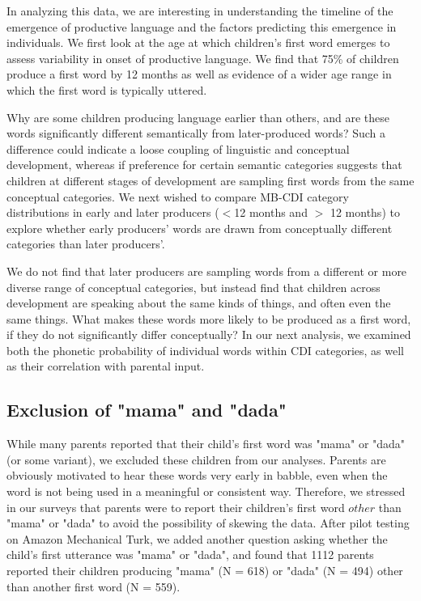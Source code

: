 \documentclass[10pt,letterpaper]{article}
\begin{document}
In analyzing this data, we are interesting in understanding the timeline of the emergence of productive language and the factors predicting this emergence in individuals. We first look at the age at which children's first word emerges to assess variability in onset of productive language. We find that 75\% of children produce a first word by 12 months as well as evidence of a wider age range in which the first word is typically uttered.

Why are some children producing language earlier than others, and are these words significantly different semantically from later-produced words? Such a difference could indicate a loose coupling of linguistic and conceptual development, whereas if preference for certain semantic categories suggests that children at different stages of development are sampling first words from the same conceptual categories. We next wished to compare MB-CDI category distributions in early and later producers ($<$12 months and $>$ 12 months) to explore whether early producers' words are drawn from conceptually different categories than later producers'.

We do not find that later producers are sampling words from a different or more diverse range of conceptual categories, but instead find that children across development are speaking about the same kinds of things, and often even the same things. What makes these words more likely to be produced as a first word, if they do not significantly differ conceptually? In our next analysis, we examined both the phonetic probability of individual words within CDI categories, as well as their correlation with parental input.

\subsection{Exclusion of "mama" and "dada"}
While many parents reported that their child's first word was "mama" or "dada" (or some variant), we excluded these children from our analyses. Parents are obviously motivated to hear these words very early in babble, even when the word is not being used in a meaningful or consistent way. Therefore, we stressed in our surveys that parents were to report their children's first word $other$ than "mama" or "dada" to avoid the possibility of skewing the data. After pilot testing on Amazon Mechanical Turk, we added another question asking whether the child's first utterance was "mama" or "dada", and found that 1112 parents reported their children producing "mama" (N = 618) or "dada" (N = 494) other than another first word (N = 559).   
\end{document}
